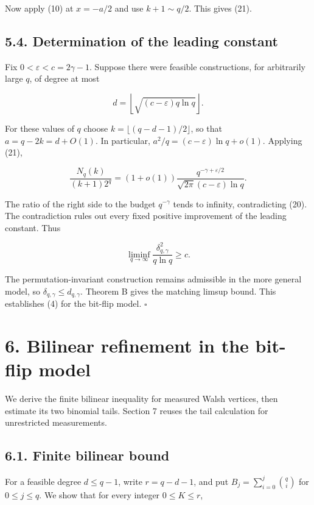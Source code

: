 \documentclass[
  10pt,
]{article}
\begin{document}
Now apply (10) at \(x=-a/2\) and use \(k+1\sim q/2\). This gives (21).

\subsection{5.4. Determination of the leading constant}\label{determination-of-the-leading-constant}

Fix \(0<\varepsilon<c=2\gamma-1\). Suppose there were feasible constructions, for arbitrarily large \(q\), of degree at most

\[
 d=\left\lfloor\sqrt{(c-\varepsilon)q\ln q}\right\rfloor.
\]

For these values of \(q\) choose \(k=\lfloor(q-d-1)/2\rfloor\), so that \(a=q-2k=d+O(1)\). In particular, \(a^2/q=(c-\varepsilon)\ln q+o(1)\). Applying (21),

\[
 \frac{N_q(k)}{(k+1)2^q}
 =(1+o(1))\frac{q^{-\gamma+\varepsilon/2}}
                  {\sqrt{2\pi}(c-\varepsilon)\ln q}.
\]

The ratio of the right side to the budget \(q^{-\gamma}\) tends to infinity, contradicting (20). The contradiction rules out every fixed positive improvement of the leading constant. Thus

\[
 \liminf_{q\to\infty}\frac{\delta_{q,\gamma}^2}{q\ln q}\ge c.
\]

The permutation-invariant construction remains admissible in the more general model, so \(\delta_{q,\gamma}\le d_{q,\gamma}\). Theorem B gives the matching limsup bound. This establishes (4) for the bit-flip model. \(\square\)

\section{6. Bilinear refinement in the bit-flip model}\label{supplementary-result-a-bilinear-refinement-and-second-order-bounds}

We derive the finite bilinear inequality for measured Walsh vertices, then estimate its two binomial tails. Section 7 reuses the tail calculation for unrestricted measurements.

\subsection{6.1. Finite bilinear bound}\label{finite-bilinear-bound}

For a feasible degree \(d\le q-1\), write \(r=q-d-1\), and put \(B_j=\sum_{i=0}^j\binom qi\) for \(0\le j\le q\). We show that for every integer \(0\le K\le r\),
\end{document}
